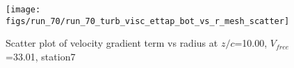 \begin{figure}[H]
\centering
\texttt{[image: figs/run\_70/run\_70\_turb\_visc\_ettap\_bot\_vs\_r\_mesh\_scatter]}
\caption{Scatter plot of velocity gradient term vs radius at $z/c$=10.00, $V_{free}$=33.01, station7}
\label{fig:run_70_turb_visc_ettap_bot_vs_r_mesh_scatter}
\end{figure}


